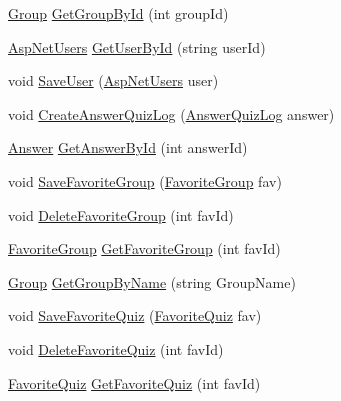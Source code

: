 \begin{DoxyCompactItemize}
\item 
\hyperlink{class_website_1_1_models_1_1_group}{Group} \hyperlink{interface_website_1_1_controllers_1_1_i_quiz_model_a7bf1bed2560232f6b4a6c07955625398}{Get\+Group\+By\+Id} (int group\+Id)
\item 
\hyperlink{class_website_1_1_asp_net_users}{Asp\+Net\+Users} \hyperlink{interface_website_1_1_controllers_1_1_i_quiz_model_a8d1cced19dd74f58c3f3536afcbe3dfb}{Get\+User\+By\+Id} (string user\+Id)
\item 
void \hyperlink{interface_website_1_1_controllers_1_1_i_quiz_model_a9eea142f3e21486b4faa3fb35ae6b95d}{Save\+User} (\hyperlink{class_website_1_1_asp_net_users}{Asp\+Net\+Users} user)
\item 
void \hyperlink{interface_website_1_1_controllers_1_1_i_quiz_model_ad76264e951307d53856d0fa7161d94d4}{Create\+Answer\+Quiz\+Log} (\hyperlink{class_website_1_1_models_1_1_answer_quiz_log}{Answer\+Quiz\+Log} answer)
\item 
\hyperlink{class_website_1_1_models_1_1_answer}{Answer} \hyperlink{interface_website_1_1_controllers_1_1_i_quiz_model_ab98feefad35be72098f5fd49396bd2fa}{Get\+Answer\+By\+Id} (int answer\+Id)
\item 
void \hyperlink{interface_website_1_1_controllers_1_1_i_quiz_model_a14d19fbaa92b0c8a37de4ae8a201b2db}{Save\+Favorite\+Group} (\hyperlink{class_website_1_1_models_1_1_favorite_group}{Favorite\+Group} fav)
\item 
void \hyperlink{interface_website_1_1_controllers_1_1_i_quiz_model_a69640890651ce764493aa7e0fc2d9f26}{Delete\+Favorite\+Group} (int fav\+Id)
\item 
\hyperlink{class_website_1_1_models_1_1_favorite_group}{Favorite\+Group} \hyperlink{interface_website_1_1_controllers_1_1_i_quiz_model_a41d4dd567e3b2811eee2f1d930b5ff8c}{Get\+Favorite\+Group} (int fav\+Id)
\item 
\hyperlink{class_website_1_1_models_1_1_group}{Group} \hyperlink{interface_website_1_1_controllers_1_1_i_quiz_model_a7f4f9371174d4f9a52ba38b730dc3872}{Get\+Group\+By\+Name} (string Group\+Name)
\item 
void \hyperlink{interface_website_1_1_controllers_1_1_i_quiz_model_affdac14dc8dc2f67103e6bfd1b5a52ad}{Save\+Favorite\+Quiz} (\hyperlink{class_website_1_1_models_1_1_favorite_quiz}{Favorite\+Quiz} fav)
\item 
void \hyperlink{interface_website_1_1_controllers_1_1_i_quiz_model_a59ee28e6f5f361da00c4d85ea4e22b72}{Delete\+Favorite\+Quiz} (int fav\+Id)
\item 
\hyperlink{class_website_1_1_models_1_1_favorite_quiz}{Favorite\+Quiz} \hyperlink{interface_website_1_1_controllers_1_1_i_quiz_model_ad5d539c5a1c2e35c78541a4dc5b135f9}{Get\+Favorite\+Quiz} (int fav\+Id)
\end{DoxyCompactItemize}


